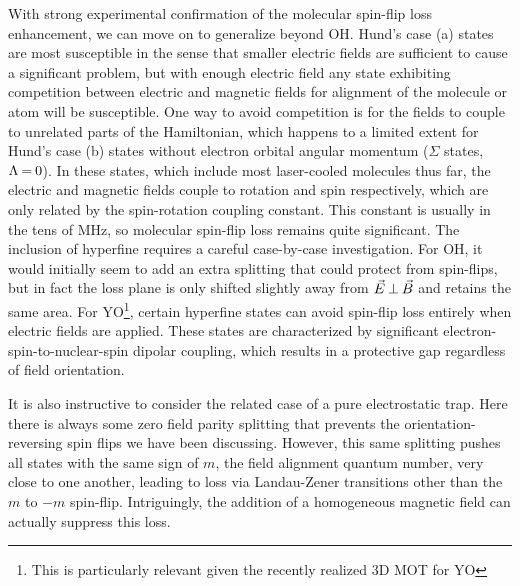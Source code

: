 \documentclass[%
 reprint,
 amsmath,amssymb,
 aps,
prl,
]{revtex4-1}
\newcommand{\epb}{{$\vec{E}\s {\perp}\s\vec{B}$}}
\newcommand{\s}{{\nobreak\hspace{.2em}}}
\begin{document}
With strong experimental confirmation of the molecular spin-flip loss enhancement, we can move on to generalize beyond OH.
Hund's case (a) states are most susceptible in the sense that smaller electric fields are sufficient to cause a significant problem, but with enough electric field any state exhibiting competition between electric and magnetic fields for alignment of the molecule or atom will be susceptible.
One way to avoid competition is for the fields to couple to unrelated parts of the Hamiltonian, which happens to a limited extent for Hund's case (b) states without electron orbital angular momentum ($\Sigma$ states, $\Lambda\s {=}\s 0$)\s\cite{Bohn2013}.
In these states, which include most laser-cooled molecules thus far, the electric and magnetic fields couple to rotation and spin respectively, which are only related by the spin-rotation coupling constant.
This constant is usually in the tens of MHz\s\cite{Quemener2016}, so molecular spin-flip loss remains quite significant.
The inclusion of hyperfine requires a careful case-by-case investigation. For OH, it would initially seem to add an extra splitting that could protect from spin-flips, but in fact the loss plane is only shifted slightly away from \epb{} and retains the same area.
For YO\s\footnote{This is particularly relevant given the recently realized 3D MOT for YO}, certain hyperfine states can avoid spin-flip loss entirely when electric fields are applied.
These states are characterized by significant electron-spin-to-nuclear-spin dipolar coupling, which results in a protective gap regardless of field orientation. %

It is also instructive to consider the related case of a pure electrostatic trap.
Here there is always some zero field parity splitting that prevents the orientation-reversing spin flips we have been discussing.
However, this same splitting pushes all states with the same sign of $m$, the field alignment quantum number, very close to one another, leading to loss via Landau-Zener transitions other than the $m$ to $-m$ spin-flip\s\cite{Wall2010}.
Intriguingly, the addition of a homogeneous magnetic field can actually suppress this loss\s\cite{Meek2011}.
\end{document}
